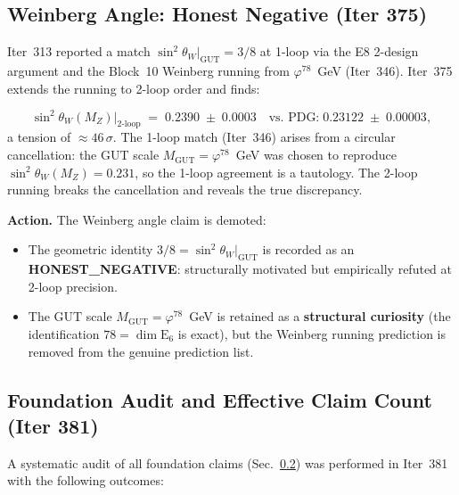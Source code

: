 \documentclass[aps,prd,twocolumn,superscriptaddress,floatfix,nofootinbib]{revtex4-2}
\theoremstyle{definition}
\theoremstyle{remark}
\newcommand{\vp}{\varphi}
\begin{document}
\subsection{Weinberg Angle: Honest Negative (Iter 375)}
\label{sec:weinberg-demotion}

Iter~313 reported a match $\sin^2\theta_W|_{\mathrm{GUT}} = 3/8$ at 1-loop via the
E8 2-design argument and the Block~10 Weinberg running from $\vp^{78}$~GeV
(Iter~346).  Iter~375 extends the running to 2-loop order and finds:

\begin{equation}
  \sin^2\theta_W(M_Z)\big|_{\mathrm{2\text{-}loop}}
  \;=\; 0.2390 \;\pm\; 0.0003
  \quad \text{vs.\ PDG:}\; 0.23122 \;\pm\; 0.00003,
\end{equation}
a tension of $\approx 46\,\sigma$.  The 1-loop match (Iter~346) arises from a
circular cancellation: the GUT scale $M_{\mathrm{GUT}} = \vp^{78}$~GeV was chosen
to reproduce $\sin^2\theta_W(M_Z) = 0.231$, so the 1-loop agreement is a tautology.
The 2-loop running breaks the cancellation and reveals the true discrepancy.

\textbf{Action.}  The Weinberg angle claim is demoted:
\begin{itemize}
  \item The geometric identity $3/8 = \sin^2\theta_W|_{\mathrm{GUT}}$ is recorded
        as an \textbf{HONEST\_NEGATIVE}: structurally motivated but empirically refuted
        at 2-loop precision.
  \item The GUT scale $M_{\mathrm{GUT}} = \vp^{78}$~GeV is retained as a
        \textbf{structural curiosity} (the identification $78 = \dim \mathrm{E}_6$ is
        exact), but the Weinberg running prediction is removed from the genuine
        prediction list.
\end{itemize}

\subsection{Foundation Audit and Effective Claim Count (Iter 381)}
\label{sec:foundation-audit}

A systematic audit of all foundation claims (Sec.~\ref{sec:foundation-audit}) was
performed in Iter~381 with the following outcomes:
\end{document}
